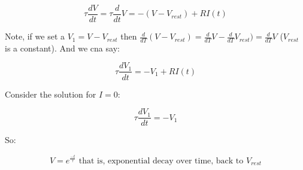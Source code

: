 \documentclass[../doc.tex]{subfiles}
\begin{document}
\begin{equation}
\tau \frac{dV}{dt} =  \tau \frac{d}{dt} V = - (V - V_{rest}) + R I(t)
\end{equation}

Note, if we set a $V_1 = V - V_{rest}$ then $\frac{d}{dT}(V - V_{rest}) = \frac{d}{dT}V - \frac{d}{dT} V_{rest}) = \frac{d}{dT}V$ ($V_{rest}$ is a constant). And we cna say:

\begin{equation}
\tau \frac{dV_1}{dt} = - V_1 + R I(t)
\end{equation}  

Consider the solution for $I = 0$:

\begin{equation}
\tau \frac{dV_1}{dt} = - V_1
\end{equation}  

So:

\begin{equation}
V = e^{\frac{-t}{\tau}} \text{ that is, exponential decay over time, back to $V_{rest}$}
\end{equation}  
\end{document}
